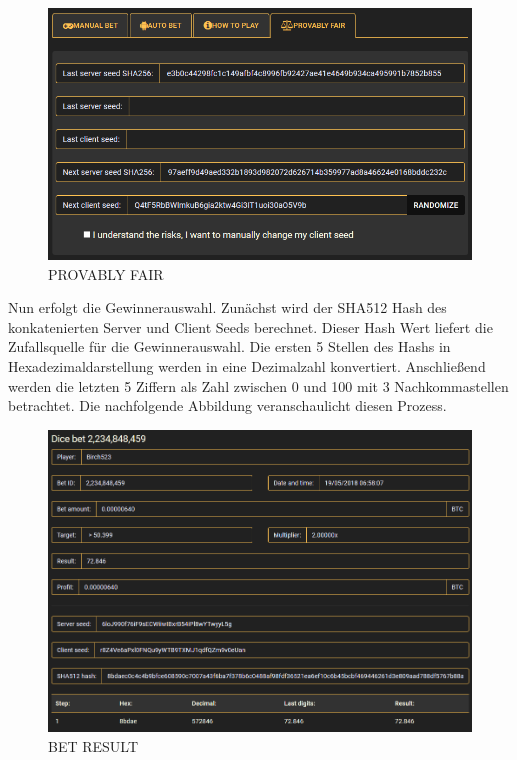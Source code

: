\begin{figure}[H]
\centering
\includegraphics[scale=0.5]{Figures/crypto_games_details}
\decoRule
\caption{PROVABLY FAIR}
\label{fig:crypto_games_details}
\end{figure}

Nun erfolgt die Gewinnerauswahl. Zunächst wird der SHA512 Hash des konkatenierten Server und Client Seeds berechnet. Dieser Hash Wert liefert die Zufallsquelle für die Gewinnerauswahl. Die ersten 5 Stellen des Hashs in Hexadezimaldarstellung werden in eine Dezimalzahl konvertiert. Anschließend werden die letzten 5 Ziffern als Zahl zwischen 0 und 100 mit 3 Nachkommastellen betrachtet. Die nachfolgende Abbildung veranschaulicht diesen Prozess.

\begin{figure}[H]
\centering
\includegraphics[scale=0.5]{Figures/crypto_games_result}
\decoRule
\caption{BET RESULT}
\label{fig:crypto_games_result}
\end{figure}

